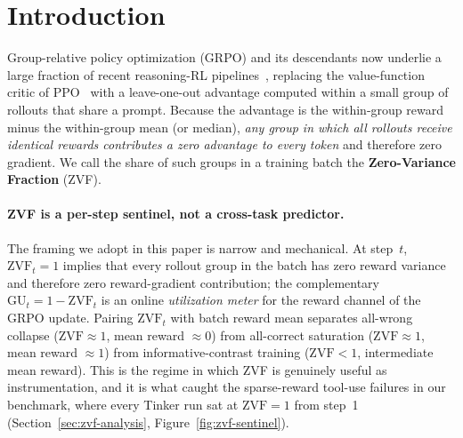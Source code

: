 \section{Introduction}
\label{sec:intro}

Group-relative policy optimization (GRPO) and its descendants now underlie a
large fraction of recent reasoning-RL pipelines~\citep{shao2024deepseekmath,%
guo2025deepseekr1nature}, replacing the value-function critic of
PPO~\citep{schulman2017proximal} with a leave-one-out advantage computed
within a small group of rollouts that share a prompt. Because the advantage
is the within-group reward minus the within-group mean (or median),
\emph{any group in which all rollouts receive identical rewards contributes a
zero advantage to every token} and therefore zero gradient. We call the
share of such groups in a training batch the \textbf{Zero-Variance Fraction}
(ZVF).

\paragraph{ZVF is a per-step sentinel, not a cross-task predictor.}
The framing we adopt in this paper is narrow and mechanical. At step~$t$,
$\mathrm{ZVF}_t = 1$ implies that every rollout group in the batch has zero
reward variance and therefore zero reward-gradient contribution; the
complementary $\mathrm{GU}_t = 1-\mathrm{ZVF}_t$ is an online \emph{utilization
meter} for the reward channel of the GRPO update. Pairing $\mathrm{ZVF}_t$
with batch reward mean separates all-wrong collapse ($\mathrm{ZVF}{\approx}1$,
mean reward $\approx 0$) from all-correct saturation ($\mathrm{ZVF}{\approx}1$,
mean reward $\approx 1$) from informative-contrast training
($\mathrm{ZVF}{<}1$, intermediate mean reward). This is the regime in which
ZVF is genuinely useful as instrumentation, and it is what caught the
sparse-reward tool-use failures in our benchmark, where every Tinker run
sat at $\mathrm{ZVF}{=}1$ from step~1 (Section~\ref{sec:zvf-analysis},
Figure~\ref{fig:zvf-sentinel}).

